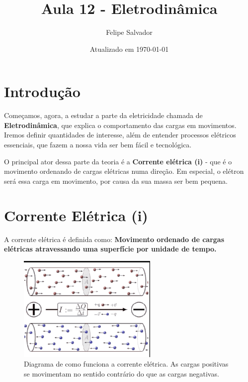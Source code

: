 \documentclass[12pt]{extarticle}
\title{Aula 12 - Eletrodinâmica}
\author{Felipe Salvador}
\date{Atualizado em \today}
\newcommand{\<}{\langle}
\renewcommand{\>}{\rangle}
\theoremstyle{definition}
\begin{document}
\maketitle

\section{Introdução}
Começamos, agora, a estudar a parte da eletricidade chamada de \textbf{Eletrodinâmica}, que explica o comportamento das cargas em movimentos. Iremos definir quantidades de interesse, além de entender processos elétricos essenciais, que fazem a nossa vida ser bem fácil e tecnológica.

O principal ator dessa parte da teoria é a \textbf{Corrente elétrica (i)} - que é o movimento ordenando de cargas elétricas numa direção. Em especial, o elétron será essa carga em movimento, por causa da sua massa ser bem pequena.

\section{Corrente Elétrica (i)}
A corrente elétrica é definida como: \textbf{Movimento ordenado de cargas elétricas atravessando uma superfície por unidade de tempo.}

\begin{figure}[H]
    \centering
    \includegraphics[width=0.6\textwidth]{current.png}
    \caption{Diagrama de como funciona a corrente elétrica. As cargas positivas se movimentam no sentido contrário do que as cargas negativas.}
    \label{fig:current}
\end{figure}
\end{document}
